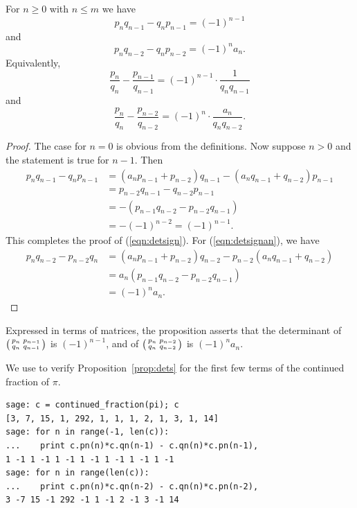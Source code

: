 \begin{proposition}\label{prop:dets}
For $n\geq 0$ with $n\leq m$ we have
\begin{equation}\label{eqn:detsign}
p_n q_{n-1} - q_n p_{n-1} = (-1)^{n-1}
\end{equation}
and
\begin{equation}\label{eqn:detsignan}
p_nq_{n-2} - q_n p_{n-2} = (-1)^n a_n.
\end{equation}
Equivalently,
$$\frac{p_n}{q_n} - \frac{p_{n-1}}{q_{n-1}} =
                  (-1)^{n-1}\cdot\frac{1}{q_n q_{n-1}}$$
and
$$\frac{p_n}{q_n} - \frac{p_{n-2}}{q_{n-2}} =
                  (-1)^{n}\cdot\frac{a_n}{q_n q_{n-2}}.$$
\end{proposition}
\begin{proof}
The case for $n=0$ is obvious from the definitions.
Now suppose $n>0$ and the statement is true for $n-1$.  Then
\begin{align*}
p_{n}q_{n-1} - q_n p_{n-1} &=
     (a_n p_{n-1} + p_{n-2}) q_{n-1} - (a_n q_{n-1} + q_{n-2}) p_{n-1}\\
  &= p_{n-2}q_{n-1} - q_{n-2} p_{n-1} \\
   &=
       -(p_{n-1}q_{n-2} - p_{n-2} q_{n-1})\\
  &= -(-1)^{n-2} = (-1)^{n-1}.
\end{align*}
This completes the proof of (\ref{eqn:detsign}).  For
(\ref{eqn:detsignan}), we have
\begin{align*}
p_n q_{n-2} - p_{n-2} q_n &=
        (a_n p_{n-1} + p_{n-2})q_{n-2} - p_{n-2}(a_n q_{n-1} + q_{n-2}) \\
       &= a_n(p_{n-1}q_{n-2} - p_{n-2}q_{n-1}) \\
       &= (-1)^n a_n.
\end{align*}
\end{proof}

\begin{remark}
Expressed in terms of matrices, the proposition asserts that the determinant
of  $\left(\begin{smallmatrix}p_n&p_{n-1}\\q_n&q_{n-1} \end{smallmatrix}\right)$ is
$(-1)^{n-1}$, and of
$\left(\begin{smallmatrix}p_n&p_{n-2}\\q_n&q_{n-2} \end{smallmatrix}\right)$ is  $(-1)^{n}a_n$.
\end{remark}

\begin{sg}
We use \sage to verify Proposition~\ref{prop:dets}
for the first few terms of the continued
fraction of $\pi$.
\begin{verbatim}
sage: c = continued_fraction(pi); c
[3, 7, 15, 1, 292, 1, 1, 1, 2, 1, 3, 1, 14]
sage: for n in range(-1, len(c)):
...    print c.pn(n)*c.qn(n-1) - c.qn(n)*c.pn(n-1),
1 -1 1 -1 1 -1 1 -1 1 -1 1 -1 1 -1
sage: for n in range(len(c)):
...    print c.pn(n)*c.qn(n-2) - c.qn(n)*c.pn(n-2),
3 -7 15 -1 292 -1 1 -1 2 -1 3 -1 14
\end{verbatim}
\end{sg}

